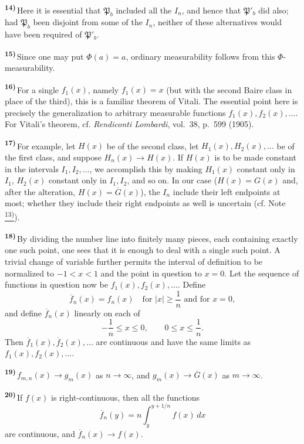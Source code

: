 \documentclass[12pt,b5paper,twoside]{article}
\newcommand{\noteref}[1]{%
  \hyperlink{note:#1}{\textsuperscript{#1)}}}
\newcommand{\originalnote}[1]{%
  \par\smallskip\noindent\hypertarget{note:#1}{\textsuperscript{\textbf{#1)}}}\,}
\begin{document}
\originalnote{14}Here it is essential that $\mathfrak{P}_b$ included all the $I_n$,
and hence that $\mathfrak{P}'_b$ did also; had $\mathfrak{P}_b$ been disjoint from
some of the $I_n$, neither of these alternatives would have been required of
$\mathfrak{P}'_b$.

\originalnote{15}Since one may put $\Phi(a)=a$, ordinary measurability follows from
this $\Phi$-measurability.

\originalnote{16}For a single $f_1(x)$, namely $f_1(x)=x$ (but with the second Baire
class in place of the third), this is a familiar theorem of Vitali.  The essential
point here is precisely the generalization to arbitrary measurable functions
$f_1(x),f_2(x),\ldots$.  For Vitali's theorem, cf. \emph{Rendiconti Lombardi},
vol.~38, p.~599 (1905).

\originalnote{17}For example, let $H(x)$ be of the second class, let
$H_1(x),H_2(x),\ldots$ be of the first class, and suppose $H_n(x)\to H(x)$.  If
$H(x)$ is to be made constant in the intervals $I_1,I_2,\ldots$, we accomplish this
by making $H_1(x)$ constant only in $I_1$, $H_2(x)$ constant only in $I_1,I_2$, and
so on.  In our case ($H(x)=G(x)$ and, after the alteration, $H(x)=\overline{G}(x)$),
the $I_n$ include their left endpoints at most; whether they include their right
endpoints as well is uncertain (cf. Note~\noteref{13}).

\originalnote{18}By dividing the number line into finitely many pieces, each
containing exactly one such point, one sees that it is enough to deal with a single
such point.  A trivial change of variable further permits the interval of definition
to be normalized to $-1<x<1$ and the point in question to $x=0$.  Let the sequence of
functions in question now be $f_1(x),f_2(x),\ldots$.  Define
\[
 \overline{f}_n(x)=f_n(x)
 \quad\text{for } |x|\geq\frac1n \text{ and for }x=0,
\]
and define $\overline{f}_n(x)$ linearly on each of
\[
 -\frac1n\leq x\leq0,
 \qquad
 0\leq x\leq\frac1n.
\]
Then $\overline{f}_1(x),\overline{f}_2(x),\ldots$ are continuous and have the same
limits as $f_1(x),f_2(x),\ldots$.

\originalnote{19}$f_{m,n}(x)\to g_m(x)$ as $n\to\infty$, and
$g_m(x)\to\overline{G}(x)$ as $m\to\infty$.

\originalnote{20}If $f(x)$ is right-continuous, then all the functions
\[
 \overline{f}_n(y)=n\int_y^{y+1/n}f(x)\,dx
\]
are continuous, and $\overline{f}_n(x)\to f(x)$.
\end{document}
